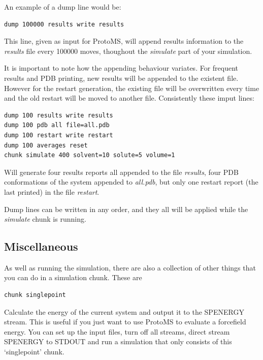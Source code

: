 \documentclass[letterpaper,10pt,english]{sphinxmanual}
\begin{document}
An example of a dump line would be:

\begin{Verbatim}[commandchars=\\\{\}]
dump 100000 results write results
\end{Verbatim}

This line, given as input for ProtoMS, will append results information to the \emph{results} file every 100000 moves, thoughout the \emph{simulate} part of your simulation.

It is important to note how the appending behaviour variates. For frequent results and PDB printing, new results will be appended to the existent file. However for the restart generation, the existing file will be overwritten every time and the old restart will be moved to another file. Consistently these imput lines:

\begin{Verbatim}[commandchars=\\\{\}]
dump 100 results write results
dump 100 pdb all file=all.pdb
dump 100 restart write restart
dump 100 averages reset
chunk simulate 400 solvent=10 solute=5 volume=1
\end{Verbatim}

Will generate four results reports all appended to the file \emph{results}, four PDB conformations of the system appended to \emph{all.pdb}, but only one restart report (the last printed) in the file \emph{restart}.

Dump lines can be written in any order, and they all will be applied while the \emph{simulate} chunk is running.


\subsection{Miscellaneous}
\label{protoms:miscellaneous}\label{protoms:misccmd}
As well as running the simulation, there are also a collection of other things that you can do in a simulation chunk. These are

\begin{Verbatim}[commandchars=\\\{\}]
chunk singlepoint
\end{Verbatim}

Calculate the energy of the current system and output it to the SPENERGY stream. This is useful if you just want to use ProtoMS to evaluate a forcefield energy. You can set up the input files, turn off all streams, direct stream SPENERGY to STDOUT and run a simulation that only consists of this ‘singlepoint’ chunk.
\end{document}

